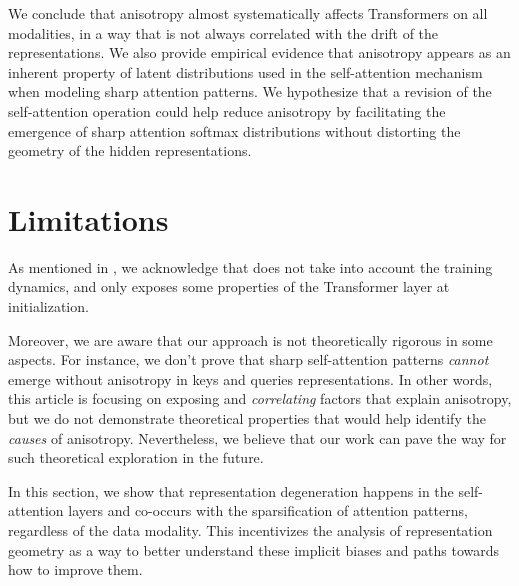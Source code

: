 We conclude that anisotropy almost systematically affects Transformers on all modalities, in a way that is not always correlated with the drift of the representations. We also provide empirical evidence that anisotropy appears as an inherent property of latent distributions used in the self-attention mechanism when modeling sharp attention patterns. We hypothesize that a revision of the self-attention operation could help reduce anisotropy by facilitating the emergence of sharp attention softmax distributions without distorting the geometry of the hidden representations.


\section*{Limitations}
As mentioned in , we acknowledge that  does not take into account the training dynamics, and only exposes some properties of the Transformer layer at initialization.

Moreover, we are aware that our approach is not theoretically rigorous in some aspects. For instance, we don't prove that sharp self-attention patterns \textit{cannot} emerge without anisotropy in keys and queries representations. In other words, this article is focusing on exposing and \textit{correlating} factors that explain anisotropy, but we do not demonstrate theoretical properties that would help identify the \textit{causes} of anisotropy. Nevertheless, we believe that our work can pave the way for such theoretical exploration in the future.

\vspace{2em}

In this section, we show that representation degeneration happens in the self-attention layers and co-occurs with the sparsification of attention patterns, regardless of the data modality. This incentivizes the analysis of representation geometry as a way to better understand these implicit biases and paths towards how to improve them. 



